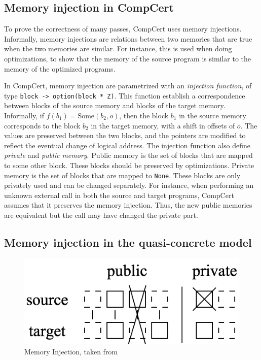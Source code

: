 \label{sec:meminj}
\subsection{Memory injection in CompCert}

To prove the correctness of many passes, CompCert uses memory injections. Informally, memory injections are relations between two memories that are true when the two memories are similar. For instance, this is used when doing optimizations, to show that the memory of the source program is similar to the memory of the optimized programs.

In CompCert, memory injection are parametrized with an \textit{injection function}, of type \texttt{block -> option(block * Z)}. This function establish a correspondence between blocks of the source memory and blocks of the target memory.
Informally, if $f(b_1)=\text{Some}(b_2,o)$, then the block $b_1$ in the source memory corresponds to the block $b_2$ in the target memory, with a shift in offsets of $o$. The values are preserved between the two blocks, and the pointers are modified to reflect the eventual change of logical address.
The injection function also define \textit{private} and \textit{public memory}. Public memory is the set of blocks that are mapped to some other block. These blocks should be preserved by optimizations.
Private memory is the set of blocks that are mapped to \texttt{None}. These blocks are only privately used and can be changed separately.
For instance, when performing an unknown external call in both the source and target programs, CompCert assumes that it preserves the memory injection. Thus, the new public memories are equivalent but the call may have changed the private part.

\subsection{Memory injection in the quasi-concrete model}

\begin{figure}
\includegraphics[scale=0.35]{img/meminj.png}
\caption{Memory Injection, taken from~\cite{DBLP:conf/pldi/KangHMGZV15}}
\label{fig:meminj}
\end{figure}


